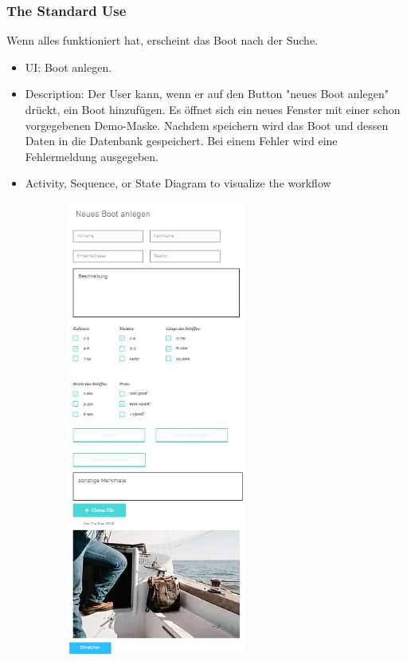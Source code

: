 \documentclass[12pt]{article}
\theoremstyle{definition}
\begin{document}
\subsubsection{The Standard Use}
Wenn alles funktioniert hat, erscheint das Boot nach der Suche.
\begin{itemize}
	\item UI: Boot anlegen.
	\item Description: Der User kann, wenn er auf den Button "neues Boot anlegen" drückt, ein Boot hinzufügen. Es öffnet sich ein neues Fenster mit einer schon vorgegebenen Demo-Maske. 
	Nachdem speichern wird das Boot und dessen Daten in die Datenbank gespeichert. Bei einem Fehler wird eine Fehlermeldung ausgegeben.
	\item Activity, Sequence, or State Diagram to visualize the workflow
\end{itemize}
\begin{center}\includegraphics[width=10cm,height=15cm,keepaspectratio]{Boot_anlegen_UI.PNG}\end{center}
\end{document}
